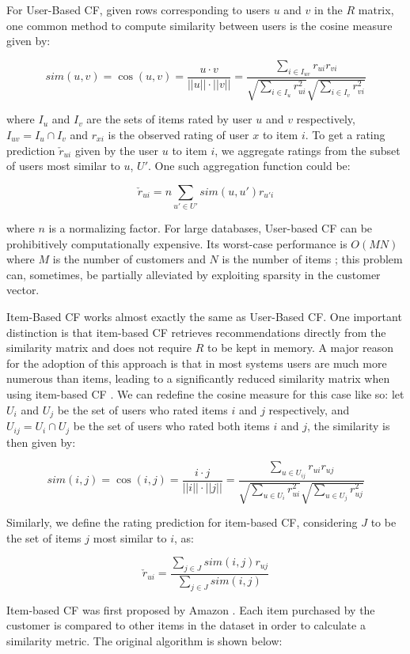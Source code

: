\documentclass[cic,tc,english]{iiufrgs}
\begin{document}
For User-Based CF, given rows corresponding to users $u$ and $v$ in the $R$ matrix, one common method to compute similarity between users is the cosine measure given by:

$$sim( u,  v) = \cos( u,  v) = \frac { u \cdot  v}{|| u|| \cdot || v||} = \frac{\sum_{i \in I_{uv}} r_{ui}r_{vi}}{\sqrt{\sum_{i \in I_u} r_{ui}^2}\sqrt{\sum_{i \in I_v} r_{vi}^2}}$$

\noindent where $I_u$ and $I_v$ are the sets of items rated by user $u$ and $v$ respectively, $I_{uv} = I_u \cap I_v$ and $r_{xi}$ is the observed rating of user $x$ to item $i$. To get a rating prediction $\check{r}_{ui}$ given by the user $u$ to item $i$, we aggregate ratings from the subset of users most similar to $u$, $U'$. One such aggregation function could be:

$$
\check{r}_{ui} = n \sum_{u' \in U'} sim(u, u')r_{u'i}
$$

\noindent where $n$ is a normalizing factor. For large databases, User-based CF can be prohibitively computationally expensive. Its worst-case performance is $O(MN)$ where $M$ is the number of customers and $N$ is the number of items \cite{Linden2003}; this problem can, sometimes, be partially alleviated by exploiting sparsity in the customer vector.

Item-Based CF works almost exactly the same as User-Based CF. One important distinction is that item-based CF retrieves recommendations directly from the similarity matrix and does not require $R$ to be kept in memory. A major reason for the adoption of this approach is that in most systems users are much more numerous than items, leading to a significantly reduced similarity matrix when using item-based CF \cite{Sarwar2001}. We can redefine the cosine measure for this case like so: let $U_i$ and $U_j$ be the set of users who rated items $i$ and $j$ respectively, and $U_{ij} = U_i \cap U_j$ be the set of users who rated both items $i$ and $j$, the similarity is then given by:


$$sim( i,  j) = \cos( i,  j) = \frac { i \cdot  j}{|| i|| \cdot || j||} = \frac{\sum_{u \in U_{ij}} r_{ui}r_{uj}}{\sqrt{\sum_{u \in U_i} r_{ui}^2}\sqrt{\sum_{u \in U_j} r_{uj}^2}}$$

Similarly, we define the rating prediction for item-based CF, considering $J$ to be the set of items $j$ most similar to $i$, as:

$$
\check{r}_{ui} = \frac{\sum_{j \in J} sim(i, j)r_{uj}}{\sum_{j \in J} sim(i, j)}
$$

Item-based CF was first proposed by Amazon \cite{Linden2003}. Each item purchased by the customer is compared to other items in the dataset in order to calculate a similarity metric. The original algorithm is shown below:
\end{document}
